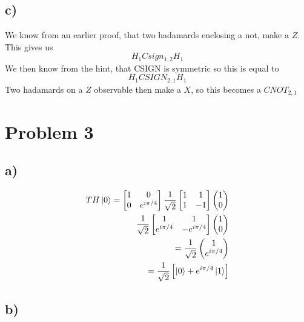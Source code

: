 \documentclass[]{article}
\begin{document}
\hypertarget{c}{%
\subsection{c)}\label{c}}

We know from an earlier proof, that two hadamards enclosing a not, make
a \(Z\). This gives us \[
H_{1}Csign_{1,2}H_{1}
\] We then know from the hint, that CSIGN is symmetric so this is equal
to \[
H_{1}CSIGN_{2,1}H_{1}
\] Two hadamards on a \(Z\) observable then make a \(X\), so this
becomes a \(CNOT_{2,1}\)

\newpage

\hypertarget{problem-3}{%
\section{Problem 3}\label{problem-3}}

\hypertarget{a-1}{%
\subsection{a)}\label{a-1}}

\[
\begin{align}
TH\ket{0} =\begin{bmatrix}
1 & 0 \\
0 & e^{ i\pi/4 }
\end{bmatrix} \frac{1}{\sqrt{ 2 }}\begin{bmatrix}
1 & 1 \\
1 & -1
\end{bmatrix}\begin{pmatrix}
1 \\
0
\end{pmatrix} \\
\frac{1}{\sqrt{ 2 }}\begin{bmatrix}
1 & 1 \\
e^{ i\pi/4 } & -e^{ i\pi/4 }
\end{bmatrix}\begin{pmatrix}
1 \\
0
\end{pmatrix} \\
=\frac{1}{\sqrt{ 2 }}\begin{pmatrix}
1 \\
e^{ i\pi/4 }
\end{pmatrix} \\
=\frac{1}{\sqrt{ 2 }}\left[ \ket{0} +e^{ i\pi/4 }\ket{1}  \right] 
\end{align}
\]

\hypertarget{b-1}{%
\subsection{b)}\label{b-1}}
\end{document}
